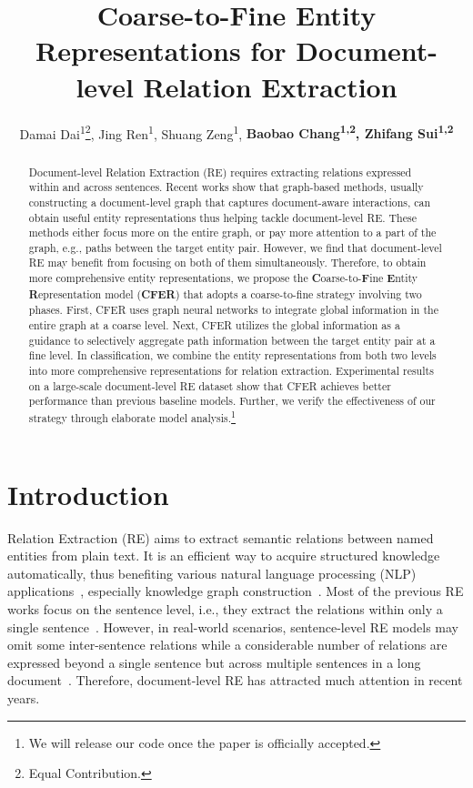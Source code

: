 \documentclass[letterpaper]{article} \usepackage{aaai21}  \usepackage{times}  \usepackage{helvet} \usepackage{courier}  \usepackage[hyphens]{url}  \usepackage{graphicx} \urlstyle{rm} \def\UrlFont{\rm}  \usepackage{natbib}  \usepackage{caption} \frenchspacing  \setlength{\pdfpagewidth}{8.5in}  \setlength{\pdfpageheight}{11in}
\title{Coarse-to-Fine Entity Representations for Document-level Relation Extraction}
\author{
    Damai Dai\textsuperscript{1}\thanks{Equal Contribution.},
    Jing Ren\textsuperscript{1}\footnotemark[1],
    Shuang Zeng\textsuperscript{1},
    \textbf{Baobao Chang\textsuperscript{1,2},
    Zhifang Sui\textsuperscript{1,2}} \\
}
\begin{document}
\maketitle

\begin{abstract}

Document-level Relation Extraction (RE) requires extracting relations expressed within and across sentences. 
Recent works show that graph-based methods, usually constructing a document-level graph that captures document-aware interactions, can obtain useful entity representations thus helping tackle document-level RE. 
These methods either focus more on the entire graph, or pay more attention to a part of the graph, e.g., paths between the target entity pair. 
However, we find that document-level RE may benefit from focusing on both of them simultaneously. 
Therefore, to obtain more comprehensive entity representations, we propose the \textbf{C}oarse-to-\textbf{F}ine \textbf{E}ntity \textbf{R}epresentation model (\textbf{CFER}) that adopts a coarse-to-fine strategy involving two phases. 
First, CFER uses graph neural networks to integrate global information in the entire graph at a coarse level. 
Next, CFER utilizes the global information as a guidance to selectively aggregate path information between the target entity pair at a fine level. 
In classification, we combine the entity representations from both two levels into more comprehensive representations for relation extraction. 
Experimental results on a large-scale document-level RE dataset show that CFER achieves better performance than previous baseline models. 
Further, we verify the effectiveness of our strategy through elaborate model analysis.\footnote{We will release our code once the paper is officially accepted. }

\end{abstract}

\section{Introduction}

Relation Extraction (RE) aims to extract semantic relations between named entities from plain text. 
It is an efficient way to acquire structured knowledge automatically, thus benefiting various natural language processing (NLP) applications~\citep{re4kbqa1,re4kbqa2,re4kbp}, especially knowledge graph construction~\citep{scierc}. 
Most of the previous RE works focus on the sentence level, i.e., they extract the relations within only a single sentence~\citep{cnn_re,pcnn_ds_re,bilstm_re,attention_ds_re}. 
However, in real-world scenarios, sentence-level RE models may omit some inter-sentence relations while a considerable number of relations are expressed beyond a single sentence but across multiple sentences in a long document~\citep{docred}. 
Therefore, document-level RE has attracted much attention in recent years. 
\end{document}
